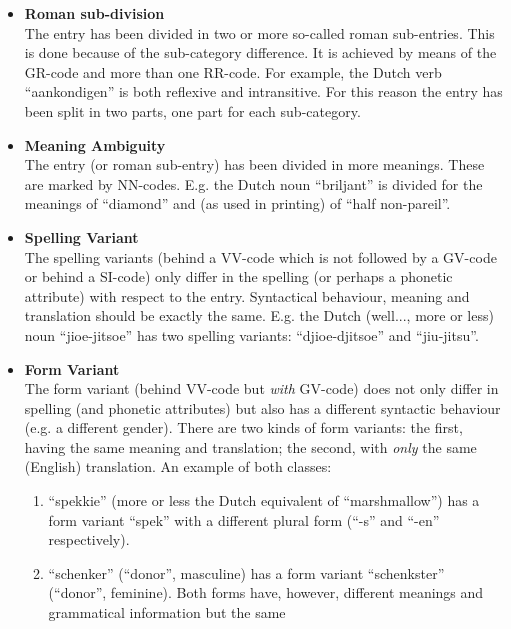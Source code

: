 \begin{itemize}
  \item {\bf Roman sub-division}\\
        The entry has been divided in two or more so-called roman sub-entries.
        This is done because of the sub-category difference. It is achieved by 
        means of the GR-code and more than one RR-code. For example, the Dutch 
        verb ``aankondigen'' is both reflexive and intransitive. For this reason
        the entry has been split in two parts,  
        one part for each sub-category.
  \item {\bf Meaning Ambiguity}\\
        The entry (or roman sub-entry) has been divided in more meanings. 
        These are marked by NN-codes. E.g. the Dutch noun ``briljant'' is 
        divided for the  meanings of ``diamond'' and (as used in printing) of 
        ``half non-pareil''.
  \item {\bf Spelling Variant}\\
        The spelling variants (behind a VV-code which is not followed
        by a GV-code or behind a SI-code) only differ in the spelling 
        (or perhaps a phonetic attribute) with respect to the entry. 
        Syntactical behaviour, meaning and translation should be exactly the 
        same. E.g. the Dutch (well..., more or less) noun ``jioe-jitsoe'' has 
        two spelling variants: ``djioe-djitsoe'' and ``jiu-jitsu''. 
  \item {\bf Form Variant}\\
        The form variant (behind VV-code but {\em with} GV-code) does not only 
        differ in spelling (and phonetic attributes) but also has a different  
        syntactic behaviour (e.g. a different gender). There are two kinds of
        form variants: the first, having the same meaning and translation;
        the second, with {\em only} the same (English) translation. An example
        of both classes: 
        \begin{enumerate}
           \item ``spekkie'' (more or less the Dutch equivalent of 
                 ``marshmallow'') has a form variant ``spek'' with
                 a different plural form (``-s'' and ``-en'' respectively).
           \item ``schenker'' (``donor'', masculine) has a form variant 
                 ``schenkster'' (``donor'', feminine). Both forms have, however,
                 different meanings and grammatical information but the same  

\end{enumerate}
\end{itemize}
